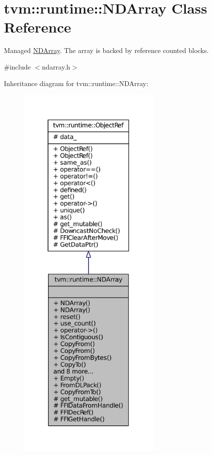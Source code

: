 \hypertarget{classtvm_1_1runtime_1_1NDArray}{}\section{tvm\+:\+:runtime\+:\+:N\+D\+Array Class Reference}
\label{classtvm_1_1runtime_1_1NDArray}


Managed \hyperlink{classtvm_1_1runtime_1_1NDArray}{N\+D\+Array}. The array is backed by reference counted blocks.  




{\ttfamily \#include $<$ndarray.\+h$>$}



Inheritance diagram for tvm\+:\+:runtime\+:\+:N\+D\+Array\+:
\nopagebreak
\begin{figure}[H]
\begin{center}
\leavevmode
\includegraphics[height=550pt]{classtvm_1_1runtime_1_1NDArray__inherit__graph}
\end{center}
\end{figure}


